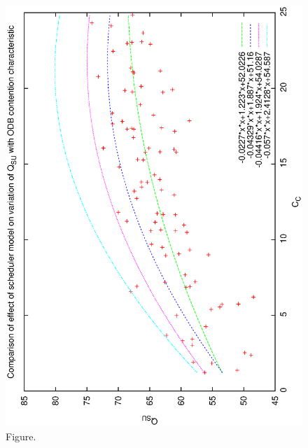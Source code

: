 \documentclass[12pt,a4paper]{article}
\begin{document}
\begin{figure}[htbp]
 \begin{center}
  \includegraphics[scale=1.0, angle=0]{figures/qsucc.eps}
 \end{center}
  \caption[Figure.]
{Figure.}
\end{figure}
\clearpage
\end{document}
